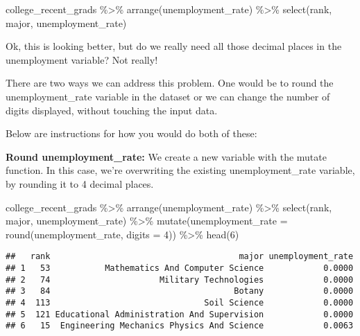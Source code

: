 \documentclass[
]{article}
\newenvironment{Shaded}{\begin{snugshade}}{\end{snugshade}}
\newcommand{\AttributeTok}[1]{\textcolor[rgb]{0.77,0.63,0.00}{#1}}
\newcommand{\DecValTok}[1]{\textcolor[rgb]{0.00,0.00,0.81}{#1}}
\newcommand{\FunctionTok}[1]{\textcolor[rgb]{0.00,0.00,0.00}{#1}}
\newcommand{\NormalTok}[1]{#1}
\newcommand{\SpecialCharTok}[1]{\textcolor[rgb]{0.00,0.00,0.00}{#1}}
\begin{document}
\begin{Shaded}
\begin{Highlighting}[]
\NormalTok{college\_recent\_grads }\SpecialCharTok{\%\textgreater{}\%}
  \FunctionTok{arrange}\NormalTok{(unemployment\_rate) }\SpecialCharTok{\%\textgreater{}\%}
  \FunctionTok{select}\NormalTok{(rank, major, unemployment\_rate)}
\end{Highlighting}
\end{Shaded}

Ok, this is looking better, but do we really need all those decimal
places in the unemployment variable? Not really!

There are two ways we can address this problem. One would be to round
the unemployment\_rate variable in the dataset or we can change the
number of digits displayed, without touching the input data.

Below are instructions for how you would do both of these:

\textbf{Round unemployment\_rate:} We create a new variable with the
mutate function. In this case, we're overwriting the existing
unemployment\_rate variable, by rounding it to 4 decimal places.

\begin{Shaded}
\begin{Highlighting}[]
\NormalTok{college\_recent\_grads }\SpecialCharTok{\%\textgreater{}\%}
  \FunctionTok{arrange}\NormalTok{(unemployment\_rate) }\SpecialCharTok{\%\textgreater{}\%}
  \FunctionTok{select}\NormalTok{(rank, major, unemployment\_rate) }\SpecialCharTok{\%\textgreater{}\%}
  \FunctionTok{mutate}\NormalTok{(}\AttributeTok{unemployment\_rate =} \FunctionTok{round}\NormalTok{(unemployment\_rate, }\AttributeTok{digits =} \DecValTok{4}\NormalTok{)) }\SpecialCharTok{\%\textgreater{}\%} 
  \FunctionTok{head}\NormalTok{(}\DecValTok{6}\NormalTok{)}
\end{Highlighting}
\end{Shaded}

\begin{verbatim}
##   rank                                      major unemployment_rate
## 1   53           Mathematics And Computer Science            0.0000
## 2   74                      Military Technologies            0.0000
## 3   84                                     Botany            0.0000
## 4  113                               Soil Science            0.0000
## 5  121 Educational Administration And Supervision            0.0000
## 6   15  Engineering Mechanics Physics And Science            0.0063
\end{verbatim}
\end{document}
